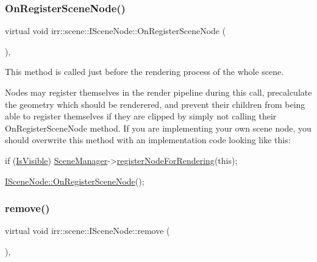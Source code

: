 \subsubsection{\texorpdfstring{On\+Register\+Scene\+Node()}{OnRegisterSceneNode()}\hspace{0.1cm}{\footnotesize\ttfamily [2/2]}}
{\footnotesize\ttfamily virtual void irr\+::scene\+::\+I\+Scene\+Node\+::\+On\+Register\+Scene\+Node (\begin{DoxyParamCaption}{ }\end{DoxyParamCaption})\hspace{0.3cm}{\ttfamily [inline]}, {\ttfamily [virtual]}}



This method is called just before the rendering process of the whole scene. 

Nodes may register themselves in the render pipeline during this call, precalculate the geometry which should be renderered, and prevent their children from being able to register themselves if they are clipped by simply not calling their On\+Register\+Scene\+Node method. If you are implementing your own scene node, you should overwrite this method with an implementation code looking like this\+: 
\begin{DoxyCode}
\textcolor{keywordflow}{if} (\hyperlink{classirr_1_1scene_1_1ISceneNode_aa834128c57215457914ef46d9b18cc5e}{IsVisible})
    \hyperlink{classirr_1_1scene_1_1ISceneNode_a679d313cbe74b0c62285494a54334311}{SceneManager}->\hyperlink{classirr_1_1scene_1_1ISceneManager_aaf17bdde6d4e9ef61a76f3b43100ecb8}{registerNodeForRendering}(\textcolor{keyword}{this});

\hyperlink{classirr_1_1scene_1_1ISceneNode_ac9795bfcb88dcaf8cba6ea3296e5d8d0}{ISceneNode::OnRegisterSceneNode}();
\end{DoxyCode}
 \mbox{\label{classirr_1_1scene_1_1ISceneNode_a2efa2670e29d6bb33b0dd99403b8b69c}} 
\subsubsection{\texorpdfstring{remove()}{remove()}\hspace{0.1cm}{\footnotesize\ttfamily [1/2]}}
{\footnotesize\ttfamily virtual void irr\+::scene\+::\+I\+Scene\+Node\+::remove (\begin{DoxyParamCaption}{ }\end{DoxyParamCaption})\hspace{0.3cm}{\ttfamily [inline]}, {\ttfamily [virtual]}}



